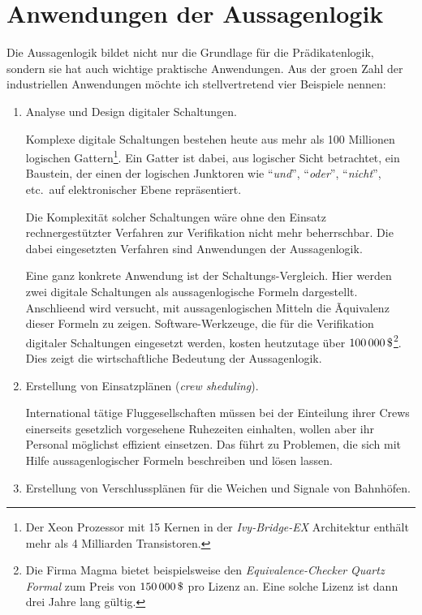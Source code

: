 \section{Anwendungen der Aussagenlogik}
Die Aussagenlogik bildet nicht nur die Grundlage f\"{u}r die Pr\"{a}dikatenlogik, sondern sie hat auch wichtige praktische
Anwendungen.  Aus der gro\3en Zahl der industriellen Anwendungen m\"{o}chte ich stellvertretend vier Beispiele nennen:
\begin{enumerate}
\item Analyse und Design digitaler Schaltungen.

      Komplexe digitale Schaltungen bestehen heute aus mehr als 100 Millionen logischen
      Gattern\footnote{
        Der Xeon Prozessor mit 15 Kernen in der \textsl{Ivy-Bridge-EX} Architektur
        enth\"{a}lt mehr als 4 Milliarden Transistoren.}.  
      Ein Gatter ist dabei, aus logischer Sicht betrachtet, ein Baustein, der einen
      der logischen Junktoren wie ``\textsl{und}'', ``\textsl{oder}'', ``\textsl{nicht}'',
      etc.~auf elektronischer Ebene repr\"{a}sentiert. 
  
      Die Komplexit\"{a}t solcher Schaltungen w\"{a}re ohne den Einsatz
      rechnergest\"{u}tzter Verfahren zur Verifikation nicht mehr beherrschbar.  Die
      dabei eingesetzten Verfahren sind Anwendungen der Aussagenlogik. 

      Eine ganz konkrete Anwendung ist der Schaltungs-Vergleich.  Hier werden zwei
      digitale Schaltungen als aussagenlogische Formeln dargestellt.
      Anschlie\3end wird versucht, mit aussagenlogischen Mitteln die Ãquivalenz dieser
      Formeln zu zeigen. Software-Werkzeuge, die f\"{u}r die Verifikation digitaler
      Schaltungen eingesetzt werden, kosten heutzutage \"{u}ber $100\,000\,\symbol{36}$\footnote{
        Die Firma Magma bietet beispielsweise den \emph{Equivalence-Checker}
        \textsl{Quartz Formal} zum Preis von $150\,000\, \symbol{36}$ pro Lizenz an.
      Eine solche Lizenz ist dann drei Jahre lang g\"{u}ltig.}.
      Dies zeigt die wirtschaftliche Bedeutung der Aussagenlogik.

\item Erstellung von Einsatzpl\"{a}nen (\emph{crew sheduling}).

      International t\"{a}tige Fluggesellschaften m\"{u}ssen bei der Einteilung ihrer Crews
      einerseits gesetzlich vorgesehene Ruhezeiten einhalten, wollen aber ihr Personal
      m\"{o}glichst effizient einsetzen.  Das f\"{u}hrt zu Problemen, die sich mit Hilfe
      aussagenlogischer Formeln beschreiben und l\"{o}sen lassen.
\item Erstellung von Verschlusspl\"{a}nen f\"{u}r die Weichen und Signale von Bahnh\"{o}fen.


\end{enumerate}
